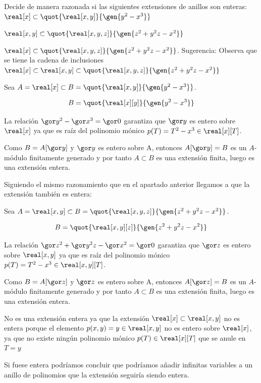 \begin{problem}[3]
	Decide de manera razonada si las siguientes extensiones de anillos son enteras:
	\ppart $\real[x] \subset \quot{\real[x,y]}{\gen{y^2-x^3}}$

	\ppart $\real[x,y] \subset \quot{\real[x,y,z]}{\gen{z^2+y^2z-x^2}}$

	\ppart $\real[x] \subset \quot{\real[x,y,z]}{\gen{z^2+y^2z-x^2}}$. Sugerencia: Observa que se tiene la cadena de inclusiones $\real[x] \subset \real[x,y] \subset \quot{\real[x,y,z]}{\gen{z^2+y^2z-x^2}}$

	\solution

	\spart 	Sea $A=\real[x] \subset B=\quot{\real[x,y]}{\gen{y^2-x^3}}$.

	$$B=\quot{\real[x][y]}{\gen{y^2-x^3}}$$

	La relación $\cls{y}^2-\cls{x}^3=\cls{0}$ garantiza que $\cls{y}$ es entero sobre $\real[x]$ ya que es raíz del polinomio mónico $p(T)=T^2-x^3 \in \real[x][T]$.

	Como $B=A[\cls{y}]$ y $\cls{y}$ es entero sobre A, entonces $A[\cls{y}]=B$ es un $A$-módulo finitamente generado y por tanto $A \subset B$ es una extensión finita, luego es una extensión entera.

	\spart Siguiendo el mismo razonamiento que en el apartado anterior llegamos a que la extensión también es entera:

	Sea $A=\real[x,y] \subset B=\quot{\real[x,y,z]}{\gen{z^2+y^2z-x^2}}$.

	$$B=\quot{\real[x,y][z]}{\gen{z^2+y^2z-x^2}}$$

	La relación $\cls{z}^2+\cls{y^2z}-\cls{x^2}=\cls{0}$ garantiza que $\cls{z}$ es entero sobre $\real[x,y]$ ya que es raíz del polinomio mónico $p(T)=T^2-x^3 \in \real[x,y][T]$.

	Como $B=A[\cls{z}]$ y $\cls{z}$ es entero sobre A, entonces $A[\cls{z}]=B$ es un $A$-módulo finitamente generado y por tanto $A \subset B$ es una extensión finita, luego es una extensión entera.

	\spart No es una extensión entera ya que la extensión $\real[x] \subset \real[x,y]$ no es entera porque el elemento $p(x,y)=y \in \real[x,y]$ no es entero sobre $\real[x]$, ya que no existe ningún polinomio mónico $p(T) \in \real[x][T]$ que se anule en $T=y$

	Si fuese entera podríamos concluir que podríamos añadir infinitas variables a un anillo de polinomios que la extensión seguiría siendo entera.

\end{problem}




